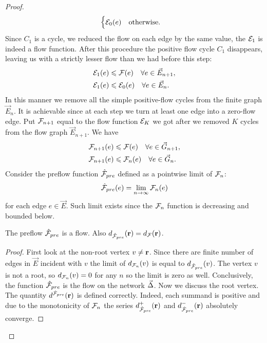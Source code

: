 \documentclass[12pt]{article}
\begin{document}
\begin{proof}
\begin{equation*}
\begin{cases}
          \cal{E}_0(e) \quad \text{otherwise}.
        \end{cases}
      \end{equation*}
      Since $C_1$ is a cycle, we reduced the flow on each edge by the same value,
        the $\cal{E}_1$ is indeed a flow function.
      After this procedure the positive flow cycle $C_1$ disappears,
        leaving us with a strictly lesser flow than we had before this step:
      \begin{align*}
        &\cal{E}_1(e) \leq \flowpos(e) \quad \forall e \in \vec{E}_{n+1},\\
        &\cal{E}_1(e) \leq \cal{E}_0(e) \quad \forall e \in \vec{E}_n.
      \end{align*}
      In this manner we remove all the simple positive-flow cycles from the finite graph $\vec{E}_n$.
      It is achievable since at each step we turn at least one edge into a zero-flow edge.
      Put $\flowposn{n+1}$ equal to the flow function $\cal{E}_K$ we got after we removed $K$ cycles from the flow graph $\vec{E}_{n+1}$.
      We have
      \begin{align*}
        &\flowposn{n+1}(e) \leq \flowpos(e) \quad \forall e \in \vec{G}_{n+1},\\
        &\flowposn{n+1}(e) \leq \flowposn{n}(e) \quad \forall e \in \vec{G}_n.
      \end{align*}
      Consider the preflow function $\preflow$ defined as a pointwise limit of $\flowposn{n}$:
      \[
        \preflow(e) = \lim_{n\to \infty}\flowposn{n}(e)
      \]
        for each edge $e \in \vec{E}$.
      Such limit exists since the $\flowposn{n}$ function is decreasing and bounded below.
      \begin{prop}
        The preflow $\preflow$ is a flow.
        Also $d_{\preflow}(\root) = d_{\flowpos}(\root)$.
      \end{prop}
      \begin{proof}
        First look at the non-root vertex $v \neq \root$.
        Since there are finite number of edges in $\vec{E}$ incident with $v$ the limit of
        $d_{\flowposn{n}}(v)$ is equal to $d_{\preflow}(v)$.
        The vertex $v$ is not a root, so $d_{\flowposn{n}}(v) = 0$ for any $n$ so the limit is zero as well.
        Conclusively, the function $\preflow$ is the flow on the network $\onet$.
        Now we discuss the root vertex.
        The quantity $d^{\preflow}(\root)$ is defined correctly.
        Indeed, each summand is positive and due to the monotonicity of $\flowposn{n}$ the series
          $d^{+}_{\preflow}(\root)$ and $d^{-}_{\preflow}(\root)$ absolutely converge.

\end{proof}
\end{proof}
\end{document}
